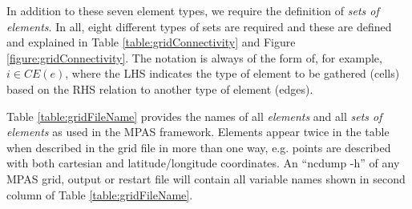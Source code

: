 In addition to these seven element types, we require the definition of {\it sets of elements}. In all, eight different types of sets are required and these are defined and explained in Table \ref{table:gridConnectivity} and Figure \ref{figure:gridConnectivity}. The notation is always of the form of, for example, $i \in CE(e)$, where the LHS indicates the type of element to be gathered (cells) based on the RHS relation to another type of element (edges).

Table \ref{table:gridFileName} provides the names of all {\it elements} and all {\it sets of elements} as used in the MPAS framework.  Elements appear twice in the table when described in the grid file in more than one way, e.g. points are described with both cartesian and latitude/longitude coordinates. An ``ncdump -h'' of any MPAS grid, output or restart file will contain all variable names shown in second column of Table  \ref{table:gridFileName}.


